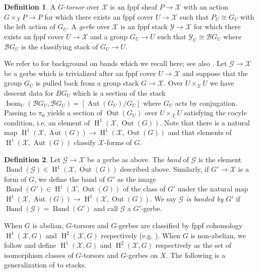 \documentclass{amsart}
\newtheorem{theorem}{Theorem}[section]
\theoremstyle{definition}
\newtheorem{definition}[definition]{Definition}
\newcommand{\cG}{\mathcal{G}}
\newcommand{\cX}{\mathcal{X}}
\newcommand{\cY}{\mathcal{Y}}
\newcommand{\cB}{\mathcal{B}}
\newcommand{\oH}{\operatorname{H}}
\DeclareMathOperator{\Out}{Out}
\DeclareMathOperator{\Aut}{Aut}
\DeclareMathOperator{\Isom}{Isom}
\DeclareMathOperator{\Band}{Band}
\begin{document}
\begin{definition}
    A $G$-\emph{torsor} over $\cX$ is an fppf sheaf $P \to \cX$ with an action $G \times_{\cX} P \to P$ for which there exists an fppf cover $U \to \cX$ such that $P_U \cong G_U$ with the left action of $G_U$. A \emph{gerbe} over $\cX$ is an fppf stack $\cY \to \cX$ for which there exists an fppf cover $U \to \cX$ and a group $G_U \to U$ such that $\cY_U \cong \cB G_U$ where $\cB G_U$ is the classifying stack of $G_U \to U$.  
\end{definition}

We refer to \cite[Chapter IV]{giraud} for background on bands which we recall here; see also \cite[Section 3.1]{edidin2001brauer}. Let $\cG \to \cX$ be a gerbe which is trivialized after an fppf cover $U \to \cX$ and suppose that the group $G_U$ is pulled back from a group stack $G \to \cX$. Over $U \times_{\cX} U$ we have descent data for $BG_U$ which is a section of the stack $\Isom_U(\cB G_U, \cB G_U) = [\Aut( G_U)/G_U]$ where $G_U$ acts by conjugation. Passing to $\pi_0$ yields a section of $\Out(G_U)$ over $U\times_{\cX} U$ satisfying the cocyle condition, i.e. an element of $\oH^1(\cX, \Out(G))$. Note that there is a natural map $\oH^1(\cX, \Aut(G)) \to \oH^1(\cX, \Out(G))$ and that elements of $\oH^1(\cX, \Aut(G))$ classify $\cX$-forms of $G$. 

\begin{definition}
        Let $\cG \to \cX$ be a gerbe 
        as above. The \emph{band} of $\cG$ is the element $\Band(\cG) \in \oH^1(\cX, \Out(G))$ described above. Similarly, if $G' \to \cX$ is a form of $G$, we define the band of $G'$ as the image $\Band(G') \in \oH^1(\cX, \Out(G))$ of the class of $G'$ under the natural map $\oH^1(\cX, \Aut(G)) \to \oH^1(\cX, \Out(G))$. We say \emph{$\cG$ is banded by $G'$} if $\Band(\cG) = \Band(G')$ and call $\cG$ a $G'$-gerbe. 
\end{definition}

\begin{comment}
\begin{theorem}
    Let $\cX$ be an algebraic stack and $G$ a sheaf of groups on $\cX_{fppf}$. Then there is a bijection between $\oH^1(\cX,G)$ and isomorphism classes of $G$-torsors on $\cX$. Similarly, if $G$ is abelian, there is a bijection between $\oH^2(\cX,G)$ and isomorphism classes of $G$-gerbes on $\cX$.
\end{theorem}
\end{comment} 

When $G$ is abelian, $G$-torsors and $G$-gerbes are classified by fppf cohomology $\oH^1(\cX,G)$ and $\oH^2(\cX,G)$ respectively (e.g. \cite[Theorems 12.1.5 \& 12.2.8]{olsson2016algebraic}). When $G$ is non-abelian,  we follow \cite{giraud} and  define $\oH^1(\cX, G)$ and  $\oH^2(\cX,G)$ respectively as the set of isomorphism classes of $G$-torsors and $G$-gerbes on $X$. The following is a generalization of \cite[Ch. V, sect. 3.2, p. 75]{Douai} to stacks. 
\end{document}
